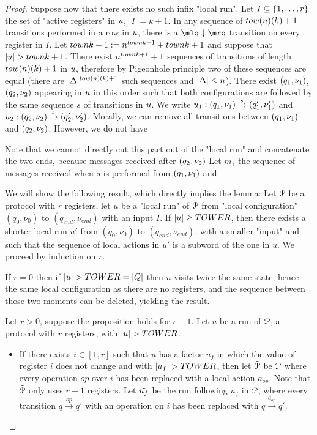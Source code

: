 \begin{proof}
Suppose now that there exists no such infix "local run".
Let $I \subseteq \{1,\dots,r\}$ the set of "active registers" in $u$, $|I| = k+1$. 
In any sequence of $\towerfun(n)(k)+1$ transitions performed in a row in $u$, 
there is a $\quotemarks{\enregact}$ transition on every register in $I$. Let $\towerfun{n}{k+1} := n^{\towerfun{n}{k}+1}+\towerfun{n}{k} +1$ and suppose that $\length{\localrun} > \towerfun{n}{k+1}$. 
There exist $n^{\towerfun{n}{k}+1}+1$ sequences of transitions of length $\towerfun(n)(k)+1$ in $u$, 
therefore by Pigeonhole principle two of these sequences are equal (there are $|\transitions|^{\towerfun(n)(k)+1}$ such sequences and $|\Delta| \leq n$). 
There exist $(q_1, \nu_1)$, $(q_2, \nu_2)$ appearing in $u$ in this order such that both configurations are followed by the same sequence $s$ of transitions in $u$. We write $u_1: (q_1, \nu_1) \xrightarrow{s} (q_1', \nu_1')$ and $u_2: (q_2, \nu_2) \xrightarrow{s} (q_2', \nu_2')$. Morally, we can remove all transitions between $(q_1, \nu_1)$ and $(q_2, \nu_2)$. However, we do not have 

 Note that we cannot directly cut this part out of the "local run" and concatenate the two ends, because messages received after $(q_2, \nu_2)$
Let $m_1$ the sequence of messages received when $s$ is performed from $(q_1, \nu_1)$ and 

	We will show the following result, which directly implies the lemma:
	Let $\mathcal{P}$ be a protocol with $r$ registers, let $u$ be a "local run" of $\mathcal{P}$ from "local configuration" $(q_0, \nu_0)$ to $(q_{end}, \nu_{end})$ with an input $I$. If $|u| \geq TOWER$, then there exists a shorter local run $u'$ from $(q_0, \nu_0)$ to $(q_{end}, \nu_{end})$, with a smaller "input" and such that the sequence of local actions in $u'$ is a subword of the one in $u$.
	We proceed by induction on $r$.
	
	If $r=0$ then if $|u| > TOWER = |Q|$ then $u$ visits twice the same state, hence the same local configuration as there are no registers, and the sequence between those two moments can be deleted, yielding the result.
	
	Let $r>0$, suppose the proposition holds for $r-1$.
	Let $u$ be a run of $\mathcal{P}$, a protocol with $r$ registers, with $|u| > TOWER$.
	
	\begin{itemize}
		\item If there exists $i \in [1,r]$ such that $u$ has a factor $u_f$ in which the value of register $i$ does not change and with $|u_f| > TOWER$, then let $\Tilde{\mathcal{P}}$ be $\mathcal{P}$ where every operation $op$ over $i$ has been replaced with a local action $a_{op}$. Note that $\Tilde{\mathcal{P}}$ only uses $r-1$ registers. 
		Let $\Tilde{u_f}$ be the run following $u_f$ in $\mathcal{P}$, where every transition $q \xrightarrow{op} q'$ with an operation on $i$ has been replaced with $q \xrightarrow{a_{op}} q'$.
		

\end{itemize}
\end{proof}
